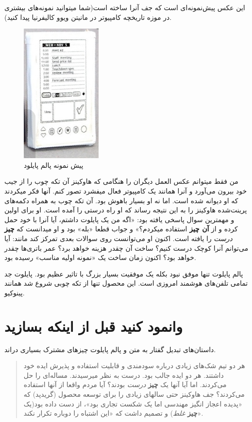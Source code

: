 این عکس پیش‌نمونه‌ای است که جف آنرا ساخته است(شما میتوانید نمونه‌های
بیشتری در موزه تاریخچه کامپیوتر در مانیتن ویوو کالیفرنیا پیدا کنید).

\begin{figure}[htbp]
\centering
\includegraphics{palmpilot.png}
\caption{پیش نمونه پالم پایلود}
\end{figure}

من فقط میتوانم عکس العمل دیگران را هنگامی که هاوکینز آن تکه چوب را از
جیب خود بیرون می‌آورد و آنرا همانند یک کامپیوتر فعال میفشرد تصور کنم.
آنها فکر میکردند که او دیوانه شده است. اما نه او بسیار باهوش بود. آن تکه
چوب به همراه دکمه‌های پرینت‌شده هاوکینز را به این نتیجه رساند که او راه
درستی را آمده است. او برای اولین و مهمترین سوال پاسخی یافته بود: «اگه من
یک پایلوت داشتم، آیا آنرا با خود حمل کرده و از \textbf{آن چیز} استفاده
میکردم؟» و جواب قطعا «بله» بود و او میدانست که \textbf{چیز} \emph{درست}
را یافته است. اکنون او می‌توانست روی سوالات بعدی تمرکز کند مانند: آیا
می‌توانم آنرا کوچک درست کنیم؟ ساخت آن چقدر هزینه خواهد برد؟ عمر باتری‌ها
چقدر خواهد بود؟ اکنون زمان ساخت یک «نمونه اولیه مناسب» رسیده بود.

پالم پایلوت تنها موفق نبود بکله یک موفقیت بسیار بزرگ با تاثیر عظیم بود.
پایلوت جد تمامی تلفن‌های هوشمند امروزی است. این محصول تنها از تکه چوبی
شروع شد همانند پینوکیو.

\section{وانمود کنید قبل از اینکه
بسازید}\label{ux648ux627ux646ux645ux648ux62f-ux6a9ux646ux6ccux62f-ux642ux628ux644-ux627ux632-ux627ux6ccux646ux6a9ux647-ux628ux633ux627ux632ux6ccux62f}

داستان‌های تبدیل گفتار به متن و پالم پایلوت چیزهای مشترک بسیاری دراند.

\begin{quote}
هر دو تیم شک‌های زیادی درباره سودمندی و قابلیت استفاده و پذیرش ایده خود
داشتند. هر دو ایده جالب بود. درست به نظر میرسیدند. مساله‌ای را حل
می‌کردند. اما آیا آنها یک \textbf{چیز} \emph{درست} بودند؟ آیا مردم واقعا
از آنها استفاده می‌کردند؟ جف هاوکینز حتی سالهای زیادی را برای توسعه
محصول (گریدپد) که «پدیده اعجاز انگیز مهندسی اما یک شکست تجاری بود»، از
دست داده بود(یک \textbf{چیز} \emph{غلط}) و تصمیم داشت که «این اشتباه را
دوباره تکرار نکند».
\end{quote}

